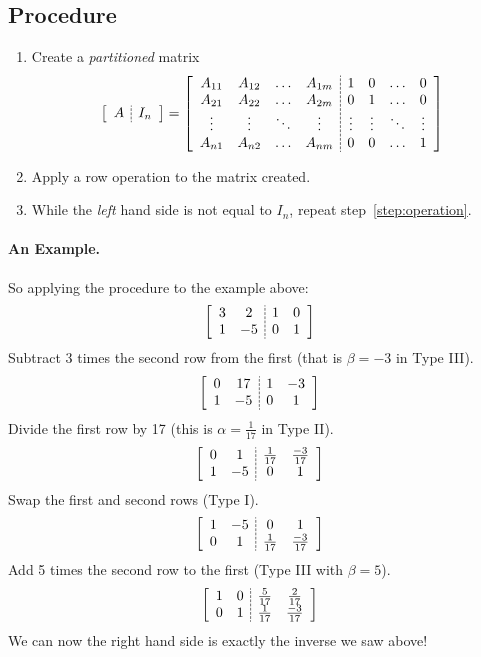 \subsection{Procedure}
\begin{enumerate}
\item Create a \textit{partitioned} matrix 
\[
\left[\begin{array}{c;{2pt/1pt}c}A&I_n\end{array}\right] = 
\left[\begin{array}{cccc;{2pt/1pt}cccc}
A_{11} & A_{12} & \hdots & A_{1m} & 1 & 0 & \hdots & 0\\
A_{21} & A_{22} & \hdots & A_{2m} & 0 & 1 & \hdots & 0\\
\vdots & \vdots & \ddots & \vdots &\vdots & \vdots & \ddots & \vdots \\
A_{n1} & A_{n2} & \hdots & A_{nm} & 0 & 0 & \hdots & 1\\
\end{array}\right]
\]
\item Apply a row operation to the matrix created.\label{step:operation}
\item While the \textit{left} hand side is not equal to $I_n$, repeat step~\ref{step:operation}.
\end{enumerate}

\paragraph{An Example.} So applying the procedure to the example above: 
\[\left[\begin{array}{cc;{2pt/1pt}cc} 3 & 2 & 1 & 0\\ 1 & -5 & 0 & 1\end{array}\right]\]
Subtract 3 times the second row from the first (that is $\beta=-3$ in Type III).
\[\left[\begin{array}{cc;{2pt/1pt}cc} 0 & 17 & 1 & -3\\ 1 & -5 & 0 & 1\end{array}\right]\]
Divide the first row by 17 (this is $\alpha=\frac{1}{17}$ in Type II).
\[\left[\begin{array}{cc;{2pt/1pt}cc} 0 & 1 & \frac{1}{17} & \frac{-3}{17}\\ 1 & -5 & 0 & 1\end{array}\right]\]
Swap the first and second rows (Type I).
\[\left[\begin{array}{cc;{2pt/1pt}cc}  1 & -5 & 0 & 1\\0 & 1 & \frac{1}{17} & \frac{-3}{17}\\\end{array}\right]\]
Add 5 times the second row to the first (Type III with $\beta=5$).
\[\left[\begin{array}{cc;{2pt/1pt}cc}  1 & 0 & \frac{5}{17} & \frac{2}{17}\\0 & 1 & \frac{1}{17} & \frac{-3}{17}\\\end{array}\right]\]
We can now the right hand side is exactly the inverse we saw above! 

